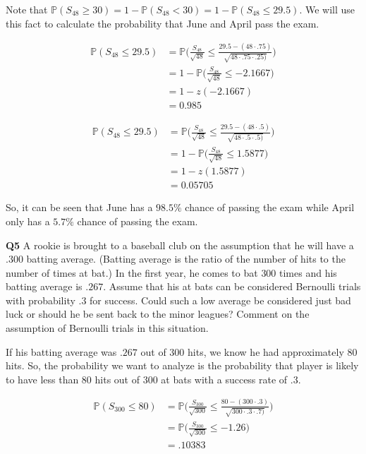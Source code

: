 \documentclass[12pt]{article}
\begin{document}
\vspace*{.3cm}
\noindent
Note that $\mathbb{P}(S_{48} \geq 30) = 1 - \mathbb{P}(S_{48} < 30) = 1 - \mathbb{P}(S_{48} \leq 29.5)$. We will use this fact to calculate the probability that June and April pass the exam.

\begin{align*}
\mathbb{P}(S_{48} \leq 29.5) &= \mathbb{P}\Bigg ( \frac{S_{48}}{\sqrt{48}} \leq \frac{29.5 - (48 \cdot .75)}{\sqrt{48 \cdot .75 \cdot .25)}} \Bigg ) \\
&= 1- \mathbb{P}\Bigg ( \frac{S_{48}}{\sqrt{48}} \leq -2.1667 \Bigg ) \\
&=  1- z(-2.1667) \\
&= 0.985
\end{align*}

\begin{align*}
\mathbb{P}(S_{48} \leq 29.5) &= \mathbb{P}\Bigg ( \frac{S_{48}}{\sqrt{48}} \leq \frac{29.5 - (48 \cdot .5)}{\sqrt{48 \cdot .5 \cdot .5)}} \Bigg ) \\
&= 1- \mathbb{P}\Bigg ( \frac{S_{48}}{\sqrt{48}} \leq 1.5877 \Bigg ) \\
&=  1- z(1.5877) \\
&= 0.05705
\end{align*}

\noindent
So, it can be seen that June has a $98.5\%$ chance of passing the exam while April only has a $5.7\%$ chance of passing the exam.

\vspace*{.3cm}
\noindent
\textbf{Q5} A rookie is brought to a baseball club on the assumption that he will have a $.300$ batting average. (Batting average is the ratio of the number of hits to the number of times at bat.) In the first year, he comes to bat $300$ times and his batting average is $.267$. Assume that his at bats can be considered Bernoulli trials with probability $.3$ for success. Could such a low average be considered just bad luck or should he be sent back to the minor leagues? Comment on the assumption of Bernoulli trials in this situation.

If his batting average was $.267$ out of $300$ hits, we know he had approximately $80$ hits. So, the probability we want to analyze is the probability that player is likely to have less than $80$ hits out of $300$ at bats with a success rate of $.3$.

\begin{align*}
\mathbb{P}(S_{300} \leq 80) &= \mathbb{P}\Bigg ( \frac{S_{300}}{\sqrt{300}} \leq \frac{80 - (300 \cdot .3)}{\sqrt{300 \cdot .3 \cdot .7)}} \Bigg ) \\
&= \mathbb{P}\Bigg ( \frac{S_{300}}{\sqrt{300}} \leq -1.26 \Bigg ) \\
&=  .10383
\end{align*}
\end{document}
